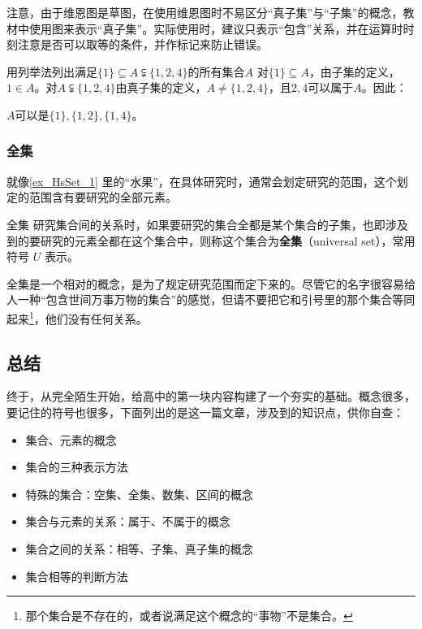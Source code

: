 注意，由于维恩图是草图，在使用维恩图时不易区分“真子集”与“子集”的概念，教材中使用图来表示“真子集”。实际使用时，建议只表示“包含”关系，并在运算时时刻注意是否可以取等的条件，并作标记来防止错误。

\begin{exercise}{用列举法列出满足$\{1\}\subseteq A\subsetneqq\{1,2,4\}$的所有集合$A$}
对$\{1\}\subseteq A$，由子集的定义，$1\in A$。对$A\subsetneqq\{1,2,4\}$由真子集的定义，$A\neq \{1,2,4\}$，且$2,4$可以属于$A$。因此：

$A$可以是$\{1\},\{1,2\},\{1,4\}$。
\end{exercise}
\subsubsection{全集}

就像\autoref{ex_HsSet_1} 里的“水果”，在具体研究时，通常会划定研究的范围，这个划定的范围含有要研究的全部元素。

\begin{definition}{全集}\label{def_HsSet_1}
研究集合间的关系时，如果要研究的集合全都是某个集合的子集，也即涉及到的要研究的元素全都在这个集合中，则称这个集合为\textbf{全集}（universal set），常用符号 $U$ 表示。
\end{definition}


全集是一个相对的概念，是为了规定研究范围而定下来的。尽管它的名字很容易给人一种“包含世间万事万物的集合”的感觉，但请不要把它和引号里的那个集合等同起来\footnote{那个集合是不存在的，或者说满足这个概念的“事物”不是集合。}，他们没有任何关系。


\subsection{总结}

终于，从完全陌生开始，给高中的第一块内容构建了一个夯实的基础。概念很多，要记住的符号也很多，下面列出的是这一篇文章，涉及到的知识点，供你自查：

\begin{itemize}
\item 集合、元素的概念
\item 集合的三种表示方法
\item 特殊的集合：空集、全集、数集、区间的概念
\item 集合与元素的关系：属于、不属于的概念
\item 集合之间的关系：相等、子集、真子集的概念
\item 集合相等的判断方法
\end{itemize}














